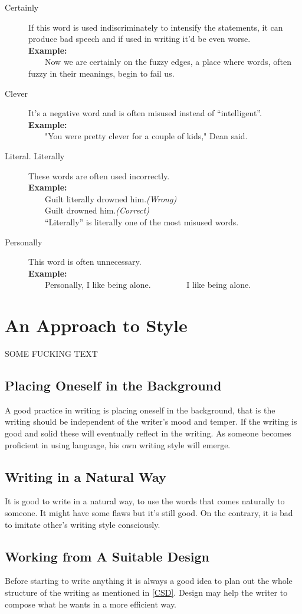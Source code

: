 \documentclass[12pt]{report}
\newcommand{\xmpl}{\textbf{Example:}\\} %
\newcommand{\indnt}{\ \ \ \ } %
\begin{document}
\begin{description}
	\item[Certainly] If this word is used indiscriminately to intensify the statements, it can produce bad speech and if used in writing it'd be even worse.\\
	\xmpl
	\indnt Now we are certainly on the fuzzy edges, a place where words, often fuzzy in their meanings, begin to fail us.
	\item[Clever] It's a negative word and is often misused instead of ``intelligent''.\\
	\xmpl
	\indnt "You were pretty clever for a couple of kids," Dean said.
	\item[Literal. Literally] These words are often used incorrectly.\\
	\xmpl
	\indnt Guilt literally drowned him.\textit{(Wrong)}\\
	\indnt Guilt drowned him.\textit{(Correct)}\\
	\indnt ``Literally'' is literally one of the most misused words.
	\item[Personally] This word is often unnecessary.\\
	\xmpl
	\indnt Personally, I like being alone. \indnt \indnt I like being alone.
\end{description}

\chapter{An Approach to Style}
SOME FUCKING TEXT
\section{Placing Oneself in the Background}
A good practice in writing is placing oneself in the background, that is the writing should be independent of the writer's mood and temper. If the writing is good and solid these will eventually reflect in the writing. As someone becomes proficient in using language, his own writing style will emerge.
\section{Writing in a Natural Way}
It is good to write in a natural way, to use the words that comes naturally to someone. It might have some flaws but it's still good. On the contrary, it is bad to imitate other's writing style consciously.
\section{Working from A Suitable Design}
Before starting to write anything it is always a good idea to plan out the whole structure of the writing as mentioned in \ref{CSD}. Design may help the writer to compose what he wants in a more efficient way.
\end{document}
